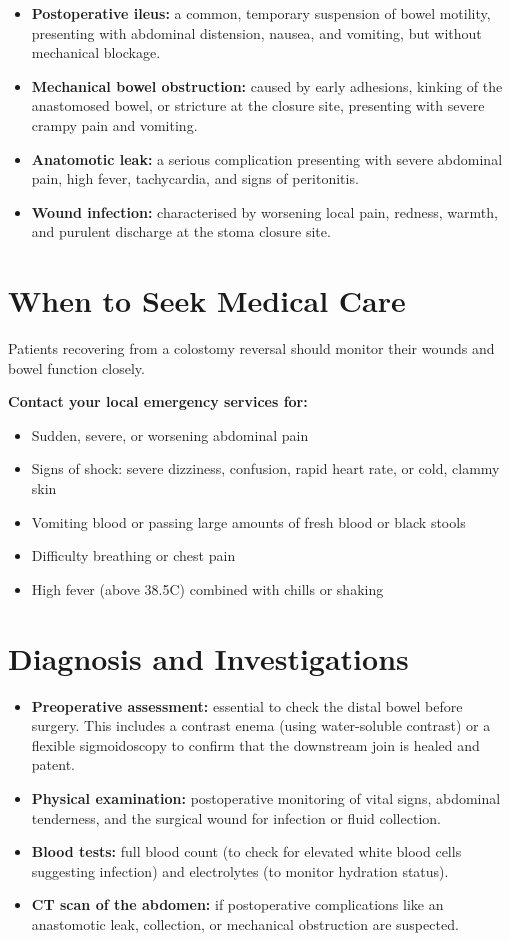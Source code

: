 \begin{itemize}
    \item \textbf{Postoperative ileus:} a common, temporary suspension of bowel motility, presenting with abdominal distension, nausea, and vomiting, but without mechanical blockage.
    \item \textbf{Mechanical bowel obstruction:} caused by early adhesions, kinking of the anastomosed bowel, or stricture at the closure site, presenting with severe crampy pain and vomiting.
    \item \textbf{Anatomotic leak:} a serious complication presenting with severe abdominal pain, high fever, tachycardia, and signs of peritonitis.
    \item \textbf{Wound infection:} characterised by worsening local pain, redness, warmth, and purulent discharge at the stoma closure site.
\end{itemize}

\section*{When to Seek Medical Care}
Patients recovering from a colostomy reversal should monitor their wounds and bowel function closely.

\textbf{Contact your local emergency services for:}
\begin{itemize}
    \item Sudden, severe, or worsening abdominal pain
    \item Signs of shock: severe dizziness, confusion, rapid heart rate, or cold, clammy skin
    \item Vomiting blood or passing large amounts of fresh blood or black stools
    \item Difficulty breathing or chest pain
    \item High fever (above 38.5\textdegree{}C) combined with chills or shaking
\end{itemize}

\section*{Diagnosis and Investigations}
\begin{itemize}
    \item \textbf{Preoperative assessment:} essential to check the distal bowel before surgery. This includes a contrast enema (using water-soluble contrast) or a flexible sigmoidoscopy to confirm that the downstream join is healed and patent.
    \item \textbf{Physical examination:} postoperative monitoring of vital signs, abdominal tenderness, and the surgical wound for infection or fluid collection.
    \item \textbf{Blood tests:} full blood count (to check for elevated white blood cells suggesting infection) and electrolytes (to monitor hydration status).
    \item \textbf{CT scan of the abdomen:} if postoperative complications like an anastomotic leak, collection, or mechanical obstruction are suspected.
\end{itemize}

